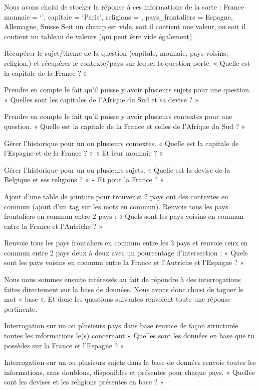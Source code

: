 \documentclass[11pt,a4paper]{article}
\begin{document}
Nous avons choisi de stocker la réponse à ces informations de la sorte :
France {
            	monnaie = ‘’,
            	capitale = ‘Paris’,
            	religions = {},
            	pays\_frontaliers = { Espagne, Allemagne, Suisse }
}
Soit un champ est vide, soit il contient une valeur, ou soit il contient un tableau de valeurs (qui peut être vide également).
 
 
Récupérer le sujet/thème de la question (capitale, monnaie, pays voisins, religion,) et récupérer le contexte/pays sur lequel la question porte.
« Quelle est la capitale de la France ? » 
 
Prendre en compte le fait qu’il puisse y avoir plusieurs sujets pour une question.
« Quelles sont les capitales de l’Afrique du Sud et sa devise ? »
 
Prendre en compte le fait qu’il puisse y avoir plusieurs contextes pour une question.
« Quelle est la capitale de la France et celles de l’Afrique du Sud ? »
 
Gérer l’historique pour un ou plusieurs contextes.
« Quelle est la capitale de l’Espagne et de la France ? »
« Et leur monnaie ? »
 
Gérer l’historique pour un ou plusieurs sujets.
« Quelle est la devise de la Belgique et ses religions ? »
« Et pour la France ? »
 
Ajout d’une table de jointure pour trouver si 2 pays ont des contextes en commun (ajout d’un tag sur les mots en commun). Renvoie tous les pays frontaliers en commun entre 2 pays :
« Quels sont les pays voisins en commun entre la France et l’Autriche ? »
 
Renvoie tous les pays frontaliers en commun entre les 3 pays et renvoie ceux en commun entre 2 pays deux à deux avec un pourcentage d’intersection :
« Quels sont les pays voisins en commun entre la France et l’Autriche et l’Espagne ? »
 
 
Nous nous sommes ensuite intéressés au fait de répondre à des interrogations faites directement sur la base de données. Nous avons donc choisi de taguer le mot « base ». Et donc les questions suivantes renvoient toute une réponse pertinente.
 
Interrogation sur un ou plusieurs pays dans base renvoie de façon structurée toutes les informations le(s) concernant
« Quelles sont les données en base que tu possèdes sur la France et l’Espagne ? »
 
Interrogation sur un ou plusieurs sujets dans la base de données renvoie toutes les informations, sans doublons, disponibles et présentes pour chaque pays.
« Quelles sont les devises et les religions présentes en base ? »
 
\end{document}

